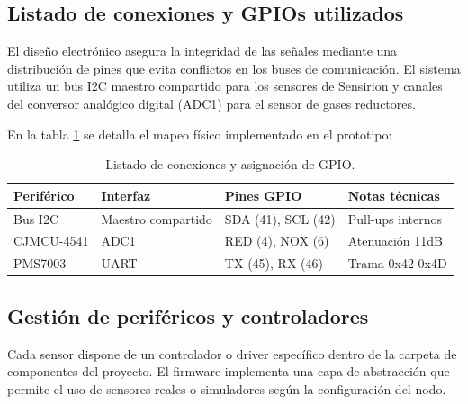 \subsection{Listado de conexiones y GPIOs utilizados}

El diseño electrónico asegura la integridad de las señales mediante una distribución de pines que evita conflictos en los buses de comunicación. El sistema utiliza un bus I2C maestro compartido para los sensores de Sensirion y canales del conversor analógico digital (ADC1) para el sensor de gases reductores.

En la tabla \ref{tab:conexiones-gpio} se detalla el mapeo físico implementado en el prototipo:

\begin{table}[h]
    \centering
    \caption{Listado de conexiones y asignación de GPIO.}
    \label{tab:conexiones-gpio}
    \begin{tabular}{p{3cm} p{3.5cm} p{3.5cm} p{3cm}}
        \toprule
        \textbf{Periférico} & \textbf{Interfaz} & \textbf{Pines GPIO} & \textbf{Notas técnicas} \\
        \midrule
        Bus I2C & Maestro compartido & SDA (41), SCL (42) & Pull-ups internos \\
        CJMCU-4541 & ADC1 & RED (4), NOX (6) & Atenuación 11dB \\
        PMS7003 & UART & TX (45), RX (46) & Trama 0x42 0x4D \\
        \bottomrule
    \end{tabular}
\end{table}

\subsection{Gestión de periféricos y controladores}

Cada sensor dispone de un controlador o driver específico dentro de la carpeta de componentes del proyecto. El firmware implementa una capa de abstracción que permite el uso de sensores reales o simuladores según la configuración del nodo.

